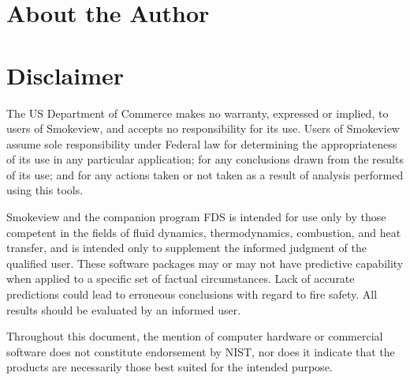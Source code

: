 \documentclass[11pt,twoside]{book}
\begin{document}

\chapter{About the Author}

\begin{description}
\gforneybio
\end{description}

%
%

\chapter{Disclaimer}

The US Department of Commerce makes no warranty, expressed or
implied, to users of Smokeview, and accepts no responsibility for
its use. Users of Smokeview assume sole responsibility under
Federal law for determining the appropriateness of its use in any
particular application; for any conclusions drawn from the results
of its use; and for any actions taken or not taken as a result of
analysis performed using this tools.

Smokeview and the companion program FDS is intended for use only
by those competent in the fields of fluid dynamics,
thermodynamics, combustion, and heat transfer, and is intended
only to supplement the informed judgment of the qualified user.
These software packages may or may not have predictive capability
when applied to a specific set of factual circumstances. Lack of
accurate predictions could lead to erroneous conclusions with
regard to fire safety. All results should be evaluated by an
informed user.

Throughout this document, the mention of computer hardware or
commercial software does not constitute endorsement by NIST, nor
does it indicate that the products are necessarily those best
suited for the intended purpose.

%
%

\end{document}
